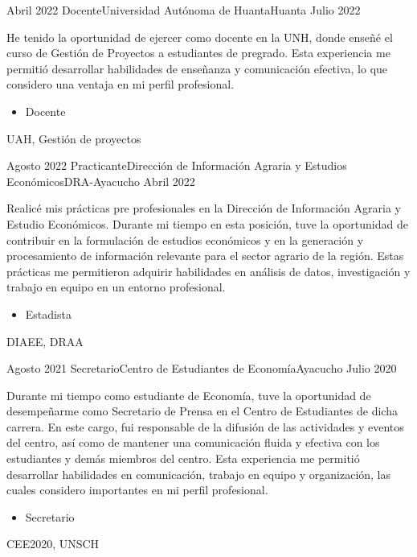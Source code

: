 
\begin{experiences}

  \experience
  {Abril 2022}    {Docente}{Universidad Autónoma de Huanta}{Huanta}
  {Julio 2022}   {
    He tenido la oportunidad de ejercer como docente en la UNH, donde enseñé el curso de Gestión de Proyectos a estudiantes de pregrado. Esta experiencia me permitió desarrollar habilidades de enseñanza y comunicación efectiva, lo que considero una ventaja en mi perfil profesional.
    \begin{itemize}
      \item Docente
    \end{itemize}
  }
  {UAH, Gestión de proyectos}
  \emptySeparator

  \experience
  {Agosto 2022}    {Practicante}{Dirección de Información Agraria y Estudios Económicos}{DRA-Ayacucho}
  {Abril 2022}   {
    Realicé mis prácticas pre profesionales en la Dirección de Información Agraria y Estudio Económicos. Durante mi tiempo en esta posición, tuve la oportunidad de contribuir en la formulación de estudios económicos y en la generación y procesamiento de información relevante para el sector agrario de la región. Estas prácticas me permitieron adquirir habilidades en análisis de datos, investigación y trabajo en equipo en un entorno profesional.
    \begin{itemize}
      \item Estadista
    \end{itemize}
  }
  {DIAEE, DRAA}
  \emptySeparator

  \experience
  {Agosto 2021}    {Secretario}{Centro de Estudiantes de Economía}{Ayacucho}
  {Julio 2020}   {
    Durante mi tiempo como estudiante de Economía, tuve la oportunidad de desempeñarme como Secretario de Prensa en el Centro de Estudiantes de dicha carrera. En este cargo, fui responsable de la difusión de las actividades y eventos del centro, así como de mantener una comunicación fluida y efectiva con los estudiantes y demás miembros del centro. Esta experiencia me permitió desarrollar habilidades en comunicación, trabajo en equipo y organización, las cuales considero importantes en mi perfil profesional.
    \begin{itemize}
      \item Secretario
    \end{itemize}
  }
  {CEE2020, UNSCH}
  \emptySeparator


\end{experiences}
